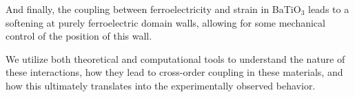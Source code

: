\documentclass[phd, titlesmallcaps,copyrightpage,foronline]{SNSthesis}
\def\Include#1{%
        \def\ChapterPath{#1/}%
        \def\GraphicsPath{\ChapterPath Images/}%
        }
\begin{document}
And finally, the coupling between ferroelectricity and strain in BaTiO$_3$ leads to a softening at purely ferroelectric domain walls, allowing for some mechanical control of the position of this wall.

We utilize both theoretical and computational tools to understand the nature of these interactions, how they lead to cross-order coupling in these materials, and how this ultimately translates into the experimentally observed behavior.
\setcounter{tocdepth}{1}
\tableofcontents
\mainmatter
\Include{GdMn2O5}
\backmatter

\printindex
\end{document}
